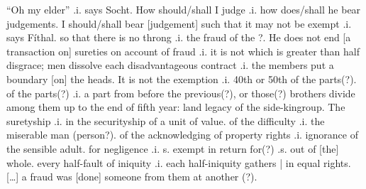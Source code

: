 \documentclass[11pt]{article}
\begin{document}
\begin{pages}
  \begin{Rightside}
    \beginnumbering\pstart
    \enquote{Oh my elder} .i. says Socht.  How should/shall I judge .i. how does/shall he bear judgements.  I should/shall bear [judgement] such that it may not be exempt .i. says F\'{i}thal. so that there is no throng .i. the fraud of the ?.  He does not end [a transaction on] sureties on account of fraud .i. it is not which is greater than half disgrace; men dissolve each disadvantageous contract .i. the members put a boundary [on] the heads.   
    \pend
    \pstart
    It is not the exemption .i. 40th or 50th of the parts(?). of the parts(?) .i. a part from before the previous(?), or those(?) brothers divide among them up to the end of fifth year: land legacy of the side-kingroup. The suretyship .i. in the securityship of a unit of value.  of the difficulty .i. the miserable man (person?). of the acknowledging of property rights .i. ignorance of the sensible adult. for negligence .i. s. exempt in return for(?) .s. out of [the] whole. every half-fault of iniquity .i. each half-iniquity gathers | in equal rights. [\ldots{}]  a fraud was [done] someone from them at another (?). 
    \pend
  \endnumbering
  \end{Rightside}
  \Pages
\end{pages}
\end{document}
